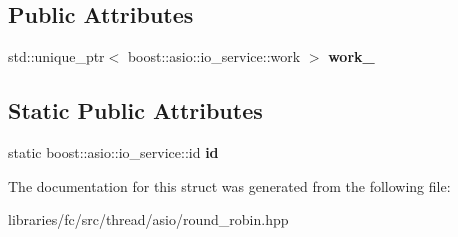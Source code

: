 \subsection*{Public Attributes}
\begin{DoxyCompactItemize}
\item 
\mbox{\label{structboost_1_1fibers_1_1asio_1_1round__robin_1_1service_ab3ee3b26155151605450e8b9020747c0}} 
std\+::unique\+\_\+ptr$<$ boost\+::asio\+::io\+\_\+service\+::work $>$ {\bfseries work\+\_\+}
\end{DoxyCompactItemize}
\subsection*{Static Public Attributes}
\begin{DoxyCompactItemize}
\item 
\mbox{\label{structboost_1_1fibers_1_1asio_1_1round__robin_1_1service_a6f248abcf76ef404a9c804fbcaa4852c}} 
static boost\+::asio\+::io\+\_\+service\+::id {\bfseries id}
\end{DoxyCompactItemize}


The documentation for this struct was generated from the following file\+:\begin{DoxyCompactItemize}
\item 
libraries/fc/src/thread/asio/round\+\_\+robin.\+hpp\end{DoxyCompactItemize}
